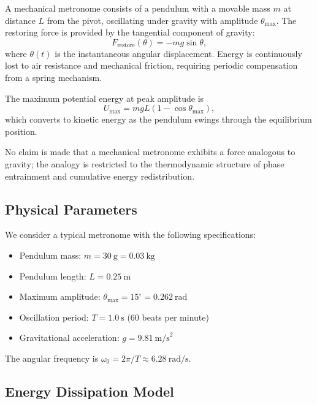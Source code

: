 \documentclass[
 reprint,
 amsmath,amssymb,
 aps,
 prb,
]{revtex4-2}
\numberwithin{equation}{section}
\begin{document}
A mechanical metronome consists of a pendulum with a movable mass $m$ at distance $L$ from the pivot, oscillating under gravity with amplitude $\theta_\text{max}$. The restoring force is provided by the tangential component of gravity:
\begin{equation}
F_\text{restore}(\theta) = -mg\sin\theta,
\label{eq:metronome_restoring_force}
\end{equation}
where $\theta(t)$ is the instantaneous angular displacement. Energy is continuously lost to air resistance and mechanical friction, requiring periodic compensation from a spring mechanism.

The maximum potential energy at peak amplitude is
\begin{equation}
U_\text{max} = mgL(1 - \cos\theta_\text{max}),
\label{eq:metronome_potential}
\end{equation}
which converts to kinetic energy as the pendulum swings through the equilibrium position.

No claim is made that a mechanical metronome exhibits a force analogous to gravity; the analogy is restricted to the thermodynamic structure of phase entrainment and cumulative energy redistribution.

\subsection{Physical Parameters}
\label{app:parameters}

We consider a typical metronome with the following specifications:

\begin{itemize}
\item Pendulum mass: $m = 30~\text{g} = 0.03~\text{kg}$
\item Pendulum length: $L = 0.25~\text{m}$
\item Maximum amplitude: $\theta_\text{max} = 15^\circ = 0.262~\text{rad}$
\item Oscillation period: $T = 1.0~\text{s}$ (60 beats per minute)
\item Gravitational acceleration: $g = 9.81~\text{m/s}^2$
\end{itemize}

The angular frequency is $\omega_0 = 2\pi/T \approx 6.28~\text{rad/s}$.

\subsection{Energy Dissipation Model}
\label{app:dissipation}
\end{document}
